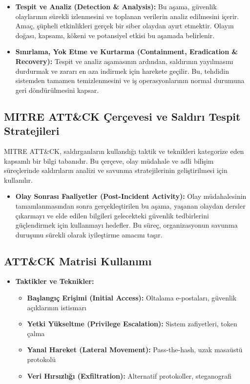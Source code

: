 \begin{itemize}
\begin{itemize}
    \item \textbf{Tespit ve Analiz (Detection \& Analysis):} Bu aşama, güvenlik olaylarının sürekli izlenmesini ve toplanan verilerin analiz edilmesini içerir. Amaç, şüpheli etkinlikleri gerçek bir siber olaydan ayırt etmektir. Olayın doğası, kapsamı, kökeni ve potansiyel etkisi bu aşamada belirlenir.

    \item \textbf{Sınırlama, Yok Etme ve Kurtarma (Containment, Eradication \& Recovery):} Tespit ve analiz aşamasının ardından, saldırının yayılmasını durdurmak ve zararı en aza indirmek için harekete geçilir. Bu, tehdidin sistemden tamamen temizlenmesini ve iş operasyonlarının normal durumuna geri döndürülmesini kapsar.
\end{itemize}

\subsection{MITRE ATT\&CK Çerçevesi ve Saldırı Tespit Stratejileri}

MITRE ATT\&CK, saldırganların kullandığı taktik ve teknikleri kategorize eden kapsamlı bir bilgi tabanıdır. Bu çerçeve, olay müdahale ve adli bilişim süreçlerinde saldırıların analizi ve savunma stratejilerinin geliştirilmesi için kullanılır.

\begin{itemize}
    \item \textbf{Olay Sonrası Faaliyetler (Post-Incident Activity):} Olay müdahalesinin tamamlanmasından sonra gerçekleştirilen bu aşama, yaşanan olaydan dersler çıkarmayı ve elde edilen bilgileri gelecekteki güvenlik tedbirlerini güçlendirmek için kullanmayı hedefler. Bu süreç, organizasyonun savunma duruşunu sürekli olarak iyileştirme amacını taşır.
\end{itemize}

\subsection{ATT\&CK Matrisi Kullanımı}

\begin{itemize}
    \item \textbf{Taktikler ve Teknikler:}
    \begin{itemize}
        \item \textbf{Başlangıç Erişimi (Initial Access):} Oltalama e-postaları, güvenlik açıklarının istismarı
        \item \textbf{Yetki Yükseltme (Privilege Escalation):} Sistem zafiyetleri, token çalma
        \item \textbf{Yanal Hareket (Lateral Movement):} Pass-the-hash, uzak masaüstü protokolü
        \item \textbf{Veri Hırsızlığı (Exfiltration):} Alternatif protokoller, steganografi
    \end{itemize}


\end{itemize}
\end{itemize}
